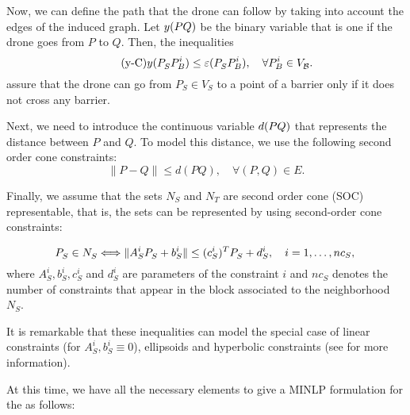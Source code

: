 \documentclass[a4paper]{elsarticle}
\newcommand{\SPP}{{\sf{H-SPP-S} \xspace}}
\newcommand{\VB}{{V^{}_{\mathcal B}}}
\newcommand{\VS}{{V^{}_{S}}}
\newcommand{\VT}{{V^{}_{T}}}
\begin{document}
\newcommand{\yvar}[2]{y(#1#2)}
\newcommand{\dvar}[2]{d(#1#2)}


Now, we can define the path that the drone can follow by taking into account the edges of the induced graph. Let $\yvar{PQ}$ be the binary variable that is one if the drone goes from $P$ to $Q$. Then, the inequalities
\begin{equation*}\tag{y-C}\label{eq:yC}
\yvar{P^{}_S}{P_B^i}\leq \varepsilonvar{P^{}_S}{P_B^i},\quad\forall P_B^i\in \VB.
\end{equation*}
assure that the drone can go from $P_S^{}\in \VS$ to a point of a barrier only if it does not cross any barrier. 

Next, we need to introduce the continuous variable $\dvar{PQ}$ that represents the distance between $P$ and $Q$. To model this distance, we use the following second order cone constraints:
\begin{equation*}\tag{d-C}\label{eq:dC}
\|P - Q\|\leq \dvar{P}{Q},\quad\forall (P,Q)\in E.
\end{equation*}

Finally, we assume that the sets $N_S$ and $N_T$ are second order cone (SOC) representable, that is, the sets can be represented by using second-order cone constraints:

\begin{equation*}
 P^{}_S\in N^{}_S \Longleftrightarrow
  \|A_S^i P_S^{} + b_S^i\| \leq (c_S^i)^T P_S^{} + d_S^i,\quad i=1,\ldots,nc_S, \\
\end{equation*}
where $A_S^i, b_S^i, c_S^i$ and $d_S^i$ are parameters of the constraint $i$ and $nc_S$ denotes the number of constraints that appear in the block associated to the neighborhood $N_S$.

It is remarkable that these inequalities can model the special case of linear constraints (for $A_S^{i}, b_S^i\equiv 0$), ellipsoids and hyperbolic constraints (see \cite{Lobo1998} for more information).

At this time, we have all the necessary elements to give a MINLP formulation for the \SPP as follows:
\end{document}
